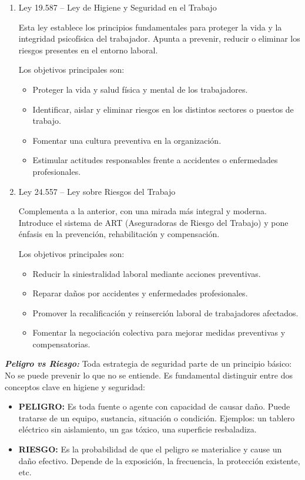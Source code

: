 \documentclass[a4paper,oneside,11pt]{article}
\begin{document}
\begin{enumerate}
    \item Ley 19.587 – Ley de Higiene y Seguridad en el Trabajo

    Esta ley establece los principios fundamentales para proteger la vida y la integridad psicofísica del trabajador. Apunta a prevenir, reducir o eliminar los riesgos presentes en el entorno laboral.

    Los objetivos principales son: 
    \begin{itemize}
        \item Proteger la vida y salud física y mental de los trabajadores.
        \item Identificar, aislar y eliminar riesgos en los distintos sectores o puestos de trabajo.
        \item Fomentar una cultura preventiva en la organización.
        \item Estimular actitudes responsables frente a accidentes o enfermedades profesionales.
    \end{itemize}

    \item Ley 24.557 – Ley sobre Riesgos del Trabajo

    Complementa a la anterior, con una mirada más integral y moderna. Introduce el sistema de ART (Aseguradoras de Riesgo del Trabajo) y pone énfasis en la prevención, rehabilitación y compensación.

    Los objetivos principales son: 
    \begin{itemize}
        \item Reducir la siniestralidad laboral mediante acciones preventivas.
        \item Reparar daños por accidentes y enfermedades profesionales.
        \item Promover la recalificación y reinserción laboral de trabajadores afectados.
        \item Fomentar la negociación colectiva para mejorar medidas preventivas y compensatorias.
    \end{itemize}
\end{enumerate}

\textbf{\textit{Peligro vs Riesgo:}} Toda estrategia de seguridad parte de un principio básico: No se puede prevenir lo que no se entiende. Es fundamental distinguir entre dos conceptos clave en higiene y seguridad:
\begin{itemize}
    \item \textbf{PELIGRO:} Es toda fuente o agente con capacidad de causar daño. Puede tratarse de un equipo, sustancia, situación o condición. Ejemplos: un tablero eléctrico sin aislamiento, un gas tóxico, una superficie resbaladiza.
    \item \textbf{RIESGO:} Es la probabilidad de que el peligro se materialice y cause un daño efectivo.
Depende de la exposición, la frecuencia, la protección existente, etc.
\end{itemize}
\end{document}
